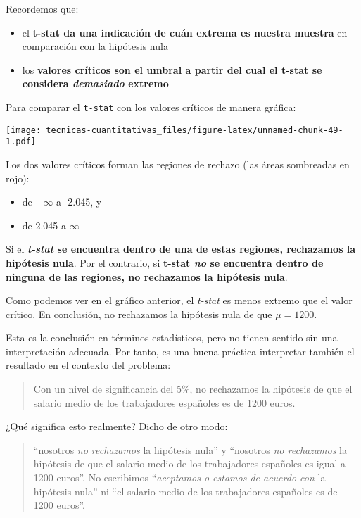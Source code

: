 \documentclass[
]{book}
\providecommand{\tightlist}{%
  \setlength{\itemsep}{0pt}\setlength{\parskip}{0pt}}
\begin{document}
Recordemos que:

\begin{itemize}
\tightlist
\item
  el \textbf{t-stat da una indicación de cuán extrema es nuestra muestra} en comparación con la hipótesis nula
\item
  los \textbf{valores críticos son el umbral a partir del cual el t-stat se considera \emph{demasiado} extremo}
\end{itemize}

Para comparar el \texttt{t-stat} con los valores críticos de manera gráfica:

\texttt{[image: tecnicas-cuantitativas\_files/figure-latex/unnamed-chunk-49-1.pdf]}

Los dos valores críticos forman las regiones de rechazo (las áreas sombreadas en rojo):

\begin{itemize}
\tightlist
\item
  de \(-\infty\) a -2.045, y
\item
  de 2.045 a \(\infty\)
\end{itemize}

Si el \textbf{\emph{t-stat} se encuentra dentro de una de estas regiones, rechazamos la hipótesis nula}. Por el contrario, si \textbf{t-stat \emph{no} se encuentra dentro de ninguna de las regiones, no rechazamos la hipótesis nula}.

Como podemos ver en el gráfico anterior, el \emph{t-stat} es menos extremo que el valor crítico. En conclusión, no rechazamos la hipótesis nula de que \(\mu = 1200\).

Esta es la conclusión en términos estadísticos, pero no tienen sentido sin una interpretación adecuada. Por tanto, es una buena práctica interpretar también el resultado en el contexto del problema:

\begin{quote}
Con un nivel de significancia del 5\%, no rechazamos la hipótesis de que el salario medio de los trabajadores españoles es de 1200 euros.
\end{quote}

¿Qué significa esto realmente? Dicho de otro modo:

\begin{quote}
``nosotros \emph{no rechazamos} la hipótesis nula'' y ``nosotros \emph{no rechazamos} la hipótesis de que el salario medio de los trabajadores españoles es igual a 1200 euros''. No escribimos ``\emph{aceptamos o estamos de acuerdo con} la hipótesis nula'' ni ``el salario medio de los trabajadores españoles es de 1200 euros''.
\end{quote}
\end{document}
